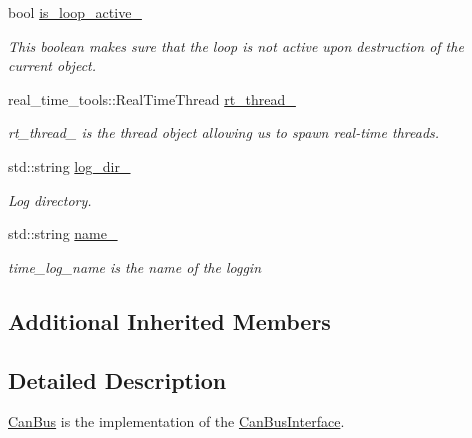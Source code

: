 \begin{DoxyCompactItemize}
\mbox{\label{classblmc__drivers_1_1CanBus_a85c9d5d9c6413c6871d48a247660ac20}} 
bool \hyperlink{classblmc__drivers_1_1CanBus_a85c9d5d9c6413c6871d48a247660ac20}{is\+\_\+loop\+\_\+active\+\_\+}
\begin{DoxyCompactList}\small\item\em This boolean makes sure that the loop is not active upon destruction of the current object. \end{DoxyCompactList}\item 
\mbox{\label{classblmc__drivers_1_1CanBus_a906baf827eff3c2850728478764a4759}} 
real\+\_\+time\+\_\+tools\+::\+Real\+Time\+Thread \hyperlink{classblmc__drivers_1_1CanBus_a906baf827eff3c2850728478764a4759}{rt\+\_\+thread\+\_\+}
\begin{DoxyCompactList}\small\item\em rt\+\_\+thread\+\_\+ is the thread object allowing us to spawn real-\/time threads. \end{DoxyCompactList}\item 
\mbox{\label{classblmc__drivers_1_1CanBus_aef341b0b36d3f02087047b5234ccbf79}} 
std\+::string \hyperlink{classblmc__drivers_1_1CanBus_aef341b0b36d3f02087047b5234ccbf79}{log\+\_\+dir\+\_\+}
\begin{DoxyCompactList}\small\item\em Log directory. \end{DoxyCompactList}\item 
\mbox{\label{classblmc__drivers_1_1CanBus_aa726bd0d63a783d2a3cc02e2ef9c929b}} 
std\+::string \hyperlink{classblmc__drivers_1_1CanBus_aa726bd0d63a783d2a3cc02e2ef9c929b}{name\+\_\+}
\begin{DoxyCompactList}\small\item\em time\+\_\+log\+\_\+name is the name of the loggin \end{DoxyCompactList}\end{DoxyCompactItemize}
\subsection*{Additional Inherited Members}


\subsection{Detailed Description}
\hyperlink{classblmc__drivers_1_1CanBus}{Can\+Bus} is the implementation of the \hyperlink{classblmc__drivers_1_1CanBusInterface}{Can\+Bus\+Interface}. 

